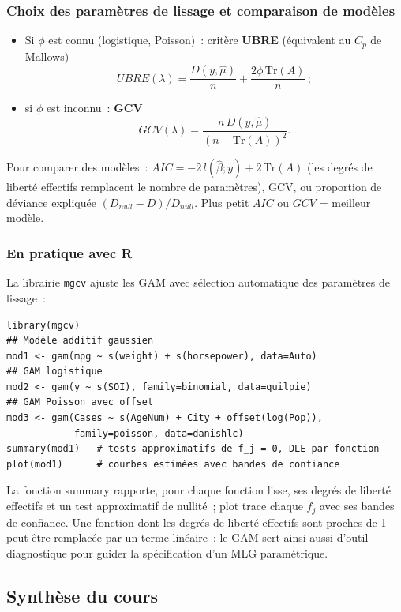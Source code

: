 \documentclass[11pt,letterpaper]{article}
\begin{document}
\subsubsection{Choix des paramètres de lissage et comparaison de modèles}

\begin{itemize}
\item Si $\phi$ est connu (logistique, Poisson)~: critère \textbf{UBRE} (équivalent au $C_p$ de Mallows)
$$UBRE(\lambda) = \frac{D(y,\hat\mu)}{n} + \frac{2\phi\,\mathrm{Tr}(A)}{n}\,;$$
\item si $\phi$ est inconnu~: \textbf{GCV}
$$GCV(\lambda) = \frac{n\,D(y,\hat\mu)}{\left(n - \mathrm{Tr}(A)\right)^2}.$$
\end{itemize}
Pour comparer des modèles~: $AIC = -2\,l(\hat\beta;y) + 2\,\mathrm{Tr}(A)$ (les degrés de liberté effectifs remplacent le nombre de paramètres), GCV, ou proportion de déviance expliquée $(D_{null} - D)/D_{null}$. Plus petit $AIC$ ou $GCV$ = meilleur modèle.

\subsubsection{En pratique avec R}

La librairie \texttt{mgcv} ajuste les GAM avec sélection automatique des paramètres de lissage~:
\begin{verbatim}
library(mgcv)
## Modèle additif gaussien
mod1 <- gam(mpg ~ s(weight) + s(horsepower), data=Auto)
## GAM logistique
mod2 <- gam(y ~ s(SOI), family=binomial, data=quilpie)
## GAM Poisson avec offset
mod3 <- gam(Cases ~ s(AgeNum) + City + offset(log(Pop)),
            family=poisson, data=danishlc)
summary(mod1)   # tests approximatifs de f_j = 0, DLE par fonction
plot(mod1)      # courbes estimées avec bandes de confiance
\end{verbatim}
La fonction \textsf{summary} rapporte, pour chaque fonction lisse, ses degrés de liberté effectifs et un test approximatif de nullité~; \textsf{plot} trace chaque $\hat f_j$ avec ses bandes de confiance. Une fonction dont les degrés de liberté effectifs sont proches de 1 peut être remplacée par un terme linéaire~: le GAM sert ainsi aussi d'outil diagnostique pour guider la spécification d'un MLG paramétrique.

\subsection{Synthèse du cours}
\end{document}
